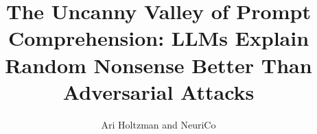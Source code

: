 \documentclass{article}
\title{The Uncanny Valley of Prompt Comprehension: LLMs Explain Random Nonsense Better Than Adversarial Attacks}
\author{Ari Holtzman and NeuriCo}
\begin{document}
\maketitle

\begin{abstract}

\end{abstract}










\end{document}
